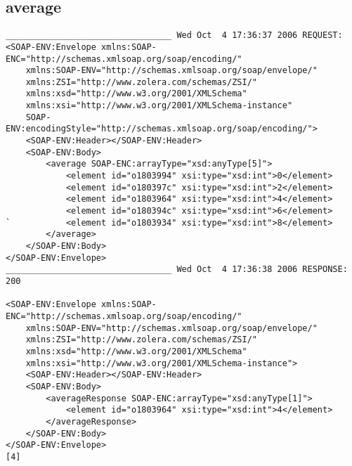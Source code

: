 \subsection{average}
\begin{verbatim}
_________________________________ Wed Oct  4 17:36:37 2006 REQUEST:
<SOAP-ENV:Envelope xmlns:SOAP-ENC="http://schemas.xmlsoap.org/soap/encoding/" 
	xmlns:SOAP-ENV="http://schemas.xmlsoap.org/soap/envelope/" 
	xmlns:ZSI="http://www.zolera.com/schemas/ZSI/" 
	xmlns:xsd="http://www.w3.org/2001/XMLSchema" 
	xmlns:xsi="http://www.w3.org/2001/XMLSchema-instance" 
	SOAP-ENV:encodingStyle="http://schemas.xmlsoap.org/soap/encoding/">
	<SOAP-ENV:Header></SOAP-ENV:Header>
	<SOAP-ENV:Body>
		<average SOAP-ENC:arrayType="xsd:anyType[5]">
			<element id="o1803994" xsi:type="xsd:int">0</element>
			<element id="o180397c" xsi:type="xsd:int">2</element>
			<element id="o1803964" xsi:type="xsd:int">4</element>
			<element id="o180394c" xsi:type="xsd:int">6</element>
`			<element id="o1803934" xsi:type="xsd:int">8</element>
		</average>
	</SOAP-ENV:Body>
</SOAP-ENV:Envelope>
_________________________________ Wed Oct  4 17:36:38 2006 RESPONSE:
200

<SOAP-ENV:Envelope xmlns:SOAP-ENC="http://schemas.xmlsoap.org/soap/encoding/" 
	xmlns:SOAP-ENV="http://schemas.xmlsoap.org/soap/envelope/" 
	xmlns:ZSI="http://www.zolera.com/schemas/ZSI/" 
	xmlns:xsd="http://www.w3.org/2001/XMLSchema" 
	xmlns:xsi="http://www.w3.org/2001/XMLSchema-instance">
	<SOAP-ENV:Header></SOAP-ENV:Header>
	<SOAP-ENV:Body>
		<averageResponse SOAP-ENC:arrayType="xsd:anyType[1]">
			<element id="o1803964" xsi:type="xsd:int">4</element>
		</averageResponse>
	</SOAP-ENV:Body>
</SOAP-ENV:Envelope>
[4]
\end{verbatim}
